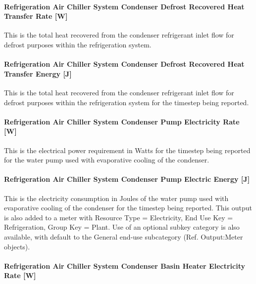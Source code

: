 \paragraph{Refrigeration Air Chiller System Condenser Defrost Recovered Heat Transfer Rate {[}W{]}}\label{refrigeration-air-chiller-system-condenser-defrost-recovered-heat-transfer-rate-w-1}

This is the total heat recovered from the condenser refrigerant inlet flow for defrost purposes within the refrigeration system.

\paragraph{Refrigeration Air Chiller System Condenser Defrost Recovered Heat Transfer Energy {[}J{]}}\label{refrigeration-air-chiller-system-condenser-defrost-recovered-heat-transfer-energy-j-1}

This is the total heat recovered from the condenser refrigerant inlet flow for defrost purposes within the refrigeration system for the timestep being reported.

\paragraph{Refrigeration Air Chiller System Condenser Pump Electricity Rate {[}W{]}}\label{refrigeration-air-chiller-system-condenser-pump-electric-power-w}

This is the electrical power requirement in Watts for the timestep being reported for the water pump used with evaporative cooling of the condenser.

\paragraph{Refrigeration Air Chiller System Condenser Pump Electric Energy {[}J{]}}\label{refrigeration-air-chiller-system-condenser-pump-electric-energy-j}

This is the electricity consumption in Joules of the water pump used with evaporative cooling of the condenser for the timestep being reported. This output is also added to a meter with Resource Type = Electricity, End Use Key = Refrigeration, Group Key = Plant. Use of an optional subkey category is also available, with default to the General end-use subcategory (Ref. Output:Meter objects).

\paragraph{Refrigeration Air Chiller System Condenser Basin Heater Electricity Rate {[}W{]}}\label{refrigeration-air-chiller-system-condenser-basin-heater-electric-power-w}

